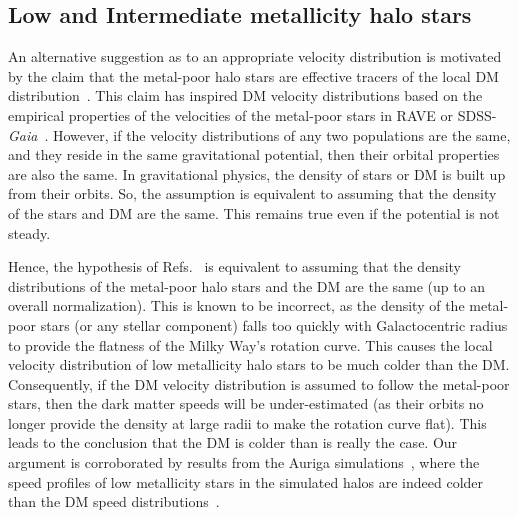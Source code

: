 \documentclass[prd,10pt,twocolumn,showpacs,nofootinbib, aps,superscriptaddress,preprintnumbers]{revtex4-1}
\begin{document}
\subsection{Low and Intermediate metallicity halo stars}

An alternative suggestion as to an appropriate velocity distribution
is motivated by the claim that the metal-poor halo stars are effective
tracers of the local DM
distribution~\citep{Herzog-Arbeitman:2017fte}. This claim has inspired
DM velocity distributions based on the empirical properties of the
velocities of the metal-poor stars in RAVE or
SDSS-\emph{Gaia}~\citep{Herzog-Arbeitman:2017zbm, Necib:2018iwb}.
However, if the velocity distributions of any two populations are the
same, and they reside in the same gravitational potential, then their
orbital properties are also the same. In gravitational physics, the
density of stars or DM is built up from their orbits. So, the
assumption is equivalent to assuming that the density of the stars and
DM are the same.  This remains true even if the potential is not
steady.

Hence, the hypothesis of
Refs.~\cite{Herzog-Arbeitman:2017fte,Herzog-Arbeitman:2017zbm,
  Necib:2018iwb} is equivalent to assuming that the density
distributions of the metal-poor halo stars and the DM are the same (up
to an overall normalization). This is known to be incorrect, as the
density of the metal-poor stars (or any stellar component) falls too
quickly with Galactocentric radius to provide the flatness of the
Milky Way's rotation curve.
This causes the local velocity distribution of low metallicity halo
stars to be much colder than the DM. Consequently, if the DM velocity
distribution is assumed to follow the metal-poor stars, then the dark
matter speeds will be under-estimated (as their orbits no longer
provide the density at large radii to make the rotation curve
flat). This leads to the conclusion that the DM is colder than is
really the case.  Our argument is corroborated by results from the
Auriga simulations~\cite{Grand:2016mgo}, where the speed profiles of
low metallicity stars in the simulated halos are indeed colder than
the DM speed distributions~\cite{BozorgniaAuriga:2018}.
\end{document}
